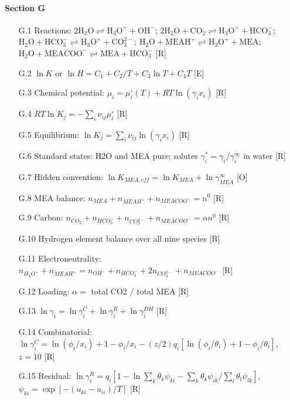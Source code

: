 \paragraph{Section G}
\begin{enumerate}[leftmargin=1.4cm,itemsep=0pt,topsep=2pt,parsep=0pt]\small
\item[G.1] Reactions: $\mathrm{2H_2O\rightleftharpoons H_3O^++OH^-}$; $\mathrm{2H_2O+CO_2\rightleftharpoons H_3O^++HCO_3^-}$; $\mathrm{H_2O+HCO_3^-\rightleftharpoons H_3O^++CO_3^{2-}}$; $\mathrm{H_2O+MEAH^+\rightleftharpoons H_3O^++MEA}$; $\mathrm{H_2O+MEACOO^-\rightleftharpoons MEA+HCO_3^-}$ {\footnotesize [R]}
\item[G.2] $\ln K$ or $\ln H=C_1+C_2/T+C_3\ln T+C_4T$ {\footnotesize [E]}
\item[G.3] Chemical potential: $\mu_i=\mu_i^\circ(T)+RT\ln(\gamma_ix_i)$ {\footnotesize [R]}
\item[G.4] $RT\ln K_j=-\sum_i\nu_{ij}\mu_i^\circ$ {\footnotesize [R]}
\item[G.5] Equilibrium: $\ln K_j=\sum_i\nu_{ij}\ln(\gamma_ix_i)$ {\footnotesize [R]}
\item[G.6] Standard states: H2O and MEA pure; solutes $\gamma_i^*=\gamma_i/\gamma_i^\infty$ in water {\footnotesize [R]}
\item[G.7] Hidden convention: $\ln K_{MEA,eff}=\ln K_{MEA}+\ln\gamma_{MEA}^\infty$ {\footnotesize [O]}
\item[G.8] MEA balance: $n_{MEA}+n_{MEAH^+}+n_{MEACOO^-}=n^0$ {\footnotesize [R]}
\item[G.9] Carbon: $n_{CO_2}+n_{HCO_3^-}+n_{CO_3^{2-}}+n_{MEACOO^-}=\alpha n^0$ {\footnotesize [R]}
\item[G.10] Hydrogen element balance over all nine species {\footnotesize [R]}
\item[G.11] Electroneutrality: $n_{H_3O^+}+n_{MEAH^+}=n_{OH^-}+n_{HCO_3^-}+2n_{CO_3^{2-}}+n_{MEACOO^-}$ {\footnotesize [R]}
\item[G.12] Loading: $\alpha=$ total CO2 / total MEA {\footnotesize [R]}
\item[G.13] $\ln\gamma_i=\ln\gamma_i^C+\ln\gamma_i^R+\ln\gamma_i^{DH}$ {\footnotesize [R]}
\item[G.14] Combinatorial: $\ln\gamma_i^C=\ln(\phi_i/x_i)+1-\phi_i/x_i-(z/2)q_i[\ln(\phi_i/\theta_i)+1-\phi_i/\theta_i]$, $z=10$ {\footnotesize [R]}
\item[G.15] Residual: $\ln\gamma_i^R=q_i[1-\ln\sum_k\theta_k\psi_{ki}-\sum_k\theta_k\psi_{ik}/\sum_l\theta_l\psi_{lk}]$, $\psi_{ki}=\exp[-(u_{ki}-u_{ii})/T]$ {\footnotesize [R]}

\end{enumerate}
